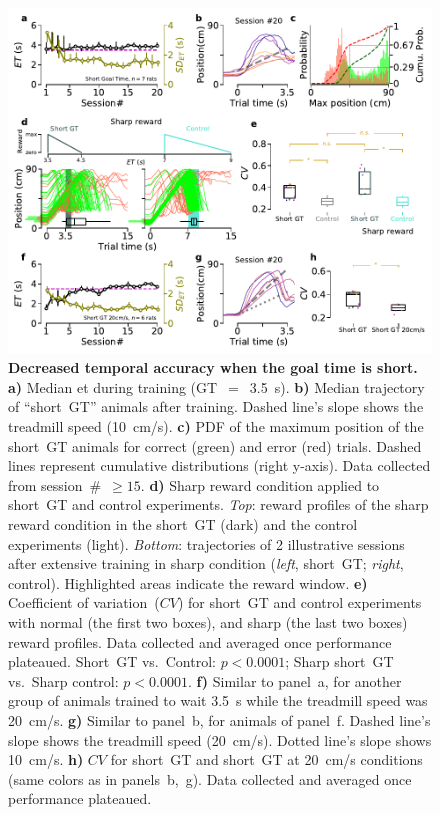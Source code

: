 \begin{figure}[!bt]
  \begin{center}
    \includegraphics[width=\textwidth]{ch-time/figures/ShortGT-SharpTrd.pdf}
    \caption[Short~GT \& Sharp Conditions]
    {\textbf{Decreased temporal accuracy when the goal time is short.}
    \textbf{a)}
    Median \gls{et} during training (GT~$=$~3.5~s).
    \textbf{b)}
    Median trajectory of ``short~GT'' animals after training.
    Dashed line's slope shows the treadmill speed (10~cm/s).
    \textbf{c)}
    PDF of the maximum position of the short~GT animals for correct (green) and error (red) trials.
    Dashed lines represent cumulative distributions (right y-axis).
    Data collected from session~\#~$\geq15$.
    \textbf{d)} 
    Sharp reward condition applied to short~GT and control experiments.
    \textit{Top}: reward profiles of the sharp reward condition in the short~GT (dark) and the control experiments (light).
    \textit{Bottom}: trajectories of 2 illustrative sessions after extensive training in sharp condition (\textit{left}, short~GT; \textit{right}, control).
    Highlighted areas indicate the reward window.
    \textbf{e)}
    Coefficient of variation~($CV$) for short~GT and control experiments with normal (the first two boxes), and sharp (the last two boxes) reward profiles.
    Data collected and averaged once performance plateaued.
    Short~GT vs.\ Control: $p<0.0001$;
    Sharp short~GT vs.\ Sharp control: $p<0.0001$.
    \textbf{f)}
    Similar to panel~a, for another group of animals trained to wait 3.5~s while the treadmill speed was 20~cm/s.
    \textbf{g)}
    Similar to panel~b, for animals of panel~f.
    Dashed line's slope shows the treadmill speed (20~cm/s).
    Dotted line's slope shows 10~cm/s.
    \textbf{h)}
    $CV$ for short~GT and short~GT at 20~cm/s conditions (same colors as in panels~b,~g).
    Data collected and averaged once performance plateaued.
    }
    \label{fig:time:shortSharp}
  \end{center}
\end{figure}